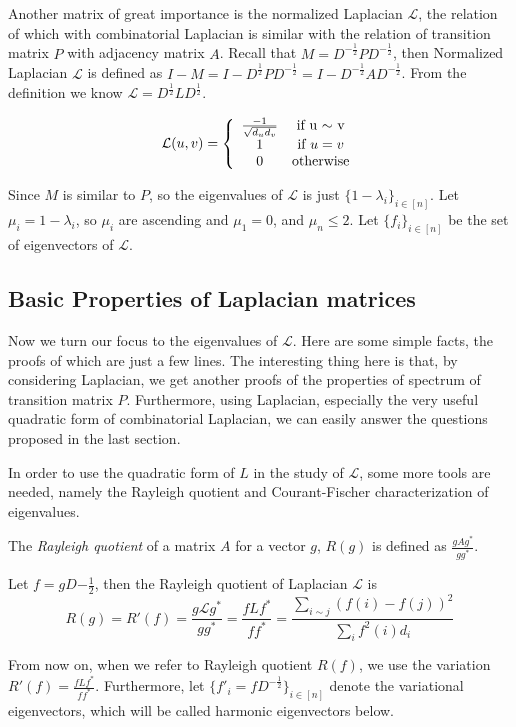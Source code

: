 Another matrix of great importance is the normalized Laplacian
$\mathcal{L}$, the relation of which with combinatorial Laplacian is
similar with the relation of transition matrix $P$ with adjacency
matrix $A$. Recall that $M=D^{-\frac{1}{2}}PD^{-\frac{1}{2}}$, then
Normalized Laplacian $\mathcal{L}$ is defined as
$I-M=I-D^\frac{1}{2}PD^{-\frac{1}{2}}=I-D^{-\frac{1}{2}}AD^{-\frac{1}{2}}$.
From the definition we know $\mathcal{L}=D^\frac{1}{2} L
D^\frac{1}{2}$.

\begin{eqnarray*}
\mathcal{L}(u,v)=\left\{
\begin{array}{cc}
-1\over \sqrt{d_ud_v} & \textrm{if u $\sim$ v}\\
1 & \textrm{if $u=v$} \\
0 & \textrm{otherwise}
\end{array}
\right.
\end{eqnarray*}

Since $M$ is similar to $P$, so the eigenvalues of $\mathcal{L}$ is
just $\{1-\lambda_i\}_{i\in[n]}$. Let $\mu_i=1-\lambda_i$, so
$\mu_i$ are ascending and $\mu_1=0$, and $\mu_n\leq2$. Let
$\{f_i\}_{i\in[n]}$ be the set of eigenvectors of $\mathcal{L}$.


\subsection{Basic Properties of Laplacian matrices}

Now we turn our focus to the eigenvalues of $\mathcal{L}$. Here are
some simple facts, the proofs of which are just a few lines. The
interesting thing here is that, by considering Laplacian, we get
another proofs of the properties of spectrum of transition matrix
$P$. Furthermore, using Laplacian, especially the very useful
quadratic form of combinatorial Laplacian, we can easily answer the
questions proposed in the last section.

In order to use the quadratic form of $L$ in the study of
$\mathcal{L}$, some more tools are needed, namely the Rayleigh
quotient and Courant-Fischer characterization of eigenvalues.

\begin{definition}
The \emph{Rayleigh quotient} of a matrix $A$ for a vector $g$,
$R(g)$ is defined as $\frac{gAg^*}{gg^*}$.
\end{definition}

\begin{fact}
Let $f=gD{-\frac{1}{2}}$, then the Rayleigh quotient of Laplacian
$\mathcal{L}$ is
\begin{equation*}
R(g)=R'(f)=\frac{g\mathcal{L}g^*}{gg^*}=\frac{fLf^*}{ff^*}=\frac{\sum_{i\sim
j} (f(i)-f(j))^2}{\sum_i f^2(i) d_i}
\end{equation*}

From now on, when we refer to Rayleigh quotient $R(f)$, we use the
variation $R'(f)=\frac{fLf^*}{ff^*}$. Furthermore, let
$\{f'_i=fD^{-\frac{1}{2}}\}_{i\in[n]}$ denote the variational
eigenvectors, which will be called harmonic eigenvectors below.
\end{fact}

